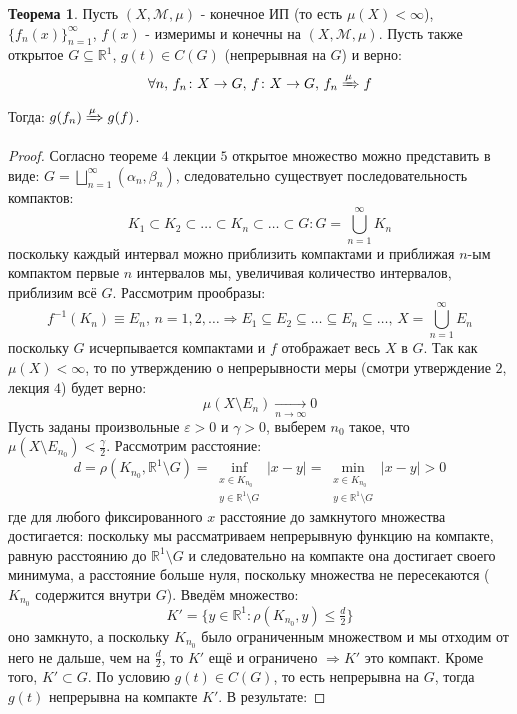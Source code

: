 \documentclass[12pt]{article}
\newcommand{\MR}{\mathbb{R}}
\newcommand{\MM}{\mathcal{M}}
\newcommand{\VE}{\varepsilon}
\theoremstyle{definition}
\newtheorem{theorem}{Теорема}
\begin{document}
\begin{theorem}
	Пусть $(X,\MM,\mu)$ - конечное ИП (то есть $\mu(X) < \infty$), $\{f_n(x)\}_{n =1 }^{\infty}$, $f(x)$ - измеримы и конечны на $(X,\MM, \mu)$. Пусть также открытое $G \subseteq \MR^1$, $g(t) \in C(G)$ (непрерывная на $G$) и верно:
	$$
		\forall n, \, f_n  \colon X \to G, \, f \colon X \to G, \, f_n \xRightarrow{\mu}f 
	$$
	Тогда: $g(f_n) \xRightarrow{\mu} g(f)$.
\end{theorem}
\begin{proof}
	Согласно теореме $4$ лекции $5$ открытое множество можно представить в виде: $G = \bigsqcup\limits_{n = 1}^{\infty}(\alpha_n,\beta_n)$, следовательно существует последовательность компактов:
	$$
		K_1 \subset K_2 \subset \dotsc \subset K_n \subset \dotsc \subset G \colon G = \bigcup\limits_{n = 1}^{\infty} K_n
	$$
	поскольку каждый интервал можно приблизить компактами и приближая $n$-ым компактом первые $n$ интервалов мы, увеличивая количество интервалов, приблизим всё $G$. Рассмотрим прообразы: 
	$$
		f^{-1}(K_n) \equiv E_n, \, n = 1,2, \dotsc \Rightarrow E_1 \subseteq E_2 \subseteq \dotsc \subseteq E_n \subseteq \dotsc, \,  X = \bigcup\limits_{n = 1}^{\infty} E_n
	$$
	поскольку $G$ исчерпывается компактами и $f$ отображает весь $X$ в $G$. Так как $\mu(X) < \infty$, то по утверждению о непрерывности меры (смотри утверждение $2$, лекция $4$) будет верно:
	$$
		\mu(X \setminus E_n) \xrightarrow[n \to \infty]{} 0
	$$
	Пусть заданы произвольные $\VE > 0$ и $\gamma > 0$, выберем $n_0$ такое, что $\mu(X \setminus E_{n_0}) < \tfrac{\gamma}{2}$. Рассмотрим расстояние:
	$$
		d = \rho(K_{n_0}, \MR^1 \setminus G) = \inf\limits_{\substack{x \in K_{n_0} \\ y \in \MR^1 \setminus G} }|x - y| = \min\limits_{\substack{x \in K_{n_0} \\ y \in \MR^1 \setminus G} }|x - y| > 0
	$$
	где для любого фиксированного $x$ расстояние до замкнутого множества достигается: поскольку мы рассматриваем непрерывную функцию на компакте, равную расстоянию до $\MR^1 \setminus G$ и следовательно на компакте она достигает своего минимума, а расстояние больше нуля, поскольку множества не пересекаются ($K_{n_0}$ содержится внутри $G$). Введём множество:
	$$
		K' = \{y \in \MR^1 \colon \rho(K_{n_0}, y) \leq \tfrac{d}{2} \}
	$$
	оно замкнуто, а поскольку $K_{n_0}$ было ограниченным множеством и мы отходим от него не дальше, чем на $\tfrac{d}{2}$, то $K'$ ещё и ограничено $\Rightarrow K'$ это компакт. Кроме того, $K' \subset G$. По условию $g(t) \in C(G)$, то есть непрерывна на $G$, тогда $g(t)$ непрерывна на компакте $K'$. В результате:

\end{proof}
\end{document}
